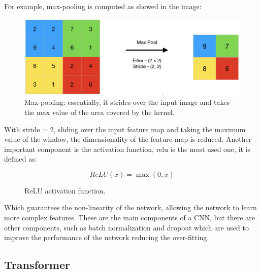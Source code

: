 For example, max-pooling is computed as showed in the image:
\begin{figure}[H]
    \centering
    \includegraphics[width=\textwidth]{images/2_max_pooling}
    \caption{Max-pooling: essentially, it strides over the input image and takes the max value of the area covered by the kernel.}
    \label{fig:figure-max-pooling}
\end{figure}
With stride = 2, sliding over the input feature map and taking the maximum value of the window, the dimensionality of the feature map is reduced.
Another important component is the activation function, \gls{relu} is the most used one, it is defined as:
\begin{figure}[H]
    \[ReLU(x) = \max(0, x)\]
    \caption{ReLU activation function.}
    \label{fig:expression-relu}
\end{figure}
Which guarantees the non-linearity of the network, allowing the network to learn more complex features.
These are the main components of a CNN, but there are other components, such as batch normalization and dropout which are used to improve the performance of the network reducing the over-fitting.
\subsection{Transformer}\label{subsec:transformer}
